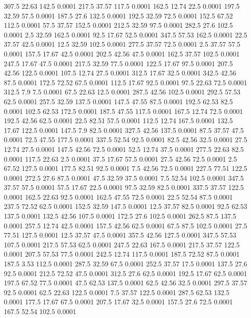 307.5	22.63	142.5	0.0001
217.5	37.57	117.5	0.0001
162.5	12.74	22.5	0.0001
197.5	32.59	57.5	0.0001
187.5	27.6	132.5	0.0001
192.5	32.59	72.5	0.0001
152.5	67.52	112.5	0.0001
57.5	37.57	152.5	0.0001
212.5	32.59	97.5	0.0001
282.5	27.6	102.5	0.0001
2.5	32.59	162.5	0.0001
92.5	17.67	52.5	0.0001
347.5	57.53	162.5	0.0001
22.5	37.57	42.5	0.0001
12.5	32.59	102.5	0.0001
277.5	37.57	72.5	0.0001
2.5	37.57	57.5	0.0001
157.5	17.67	42.5	0.0001
202.5	42.56	47.5	0.0001
162.5	37.57	102.5	0.0001
247.5	17.67	47.5	0.0001
217.5	32.59	77.5	0.0001
122.5	17.67	97.5	0.0001
207.5	42.56	122.5	0.0001
107.5	12.74	27.5	0.0001
312.5	17.67	32.5	0.0001
342.5	42.56	87.5	0.0001
172.5	72.52	67.5	0.0001
112.5	17.67	92.5	0.0001
97.5	22.63	72.5	0.0001
312.5	7.9	7.5	0.0001
67.5	22.63	12.5	0.0001
287.5	42.56	102.5	0.0001
292.5	57.53	62.5	0.0001
257.5	32.59	137.5	0.0001
147.5	47.55	87.5	0.0001
192.5	62.53	82.5	0.0001
102.5	62.53	172.5	0.0001
187.5	47.55	117.5	0.0001
167.5	12.74	72.5	0.0001
192.5	42.56	62.5	0.0001
22.5	82.51	57.5	0.0001
112.5	12.74	167.5	0.0001
132.5	17.67	122.5	0.0001
147.5	7.9	82.5	0.0001
327.5	42.56	137.5	0.0001
87.5	37.57	47.5	0.0001
72.5	47.55	177.5	0.0001
337.5	52.54	92.5	0.0001
82.5	42.56	32.5	0.0001
27.5	12.74	27.5	0.0001
147.5	42.56	72.5	0.0001
52.5	12.74	37.5	0.0001
277.5	22.63	82.5	0.0001
117.5	22.63	2.5	0.0001
37.5	17.67	57.5	0.0001
27.5	42.56	72.5	0.0001
2.5	67.52	127.5	0.0001
177.5	82.51	92.5	0.0001
7.5	42.56	72.5	0.0001
227.5	77.51	122.5	0.0001
272.5	27.6	87.5	0.0001
47.5	32.59	37.5	0.0001
7.5	52.54	102.5	0.0001
347.5	37.57	57.5	0.0001
57.5	17.67	22.5	0.0001
97.5	32.59	82.5	0.0001
337.5	37.57	122.5	0.0001
162.5	22.63	92.5	0.0001
162.5	47.55	72.5	0.0001
22.5	52.54	87.5	0.0001
237.5	72.52	62.5	0.0001
152.5	32.59	147.5	0.0001
12.5	37.57	82.5	0.0001
92.5	62.53	137.5	0.0001
132.5	42.56	107.5	0.0001
172.5	27.6	102.5	0.0001
262.5	87.5	137.5	0.0001
257.5	12.74	42.5	0.0001
157.5	42.56	62.5	0.0001
67.5	87.5	102.5	0.0001
27.5	77.51	127.5	0.0001
12.5	37.57	47.5	0.0001
357.5	42.56	127.5	0.0001
347.5	57.53	107.5	0.0001
217.5	57.53	62.5	0.0001
247.5	22.63	167.5	0.0001
217.5	37.57	122.5	0.0001
207.5	57.53	77.5	0.0001
242.5	12.74	117.5	0.0001
187.5	72.52	87.5	0.0001
187.5	3.53	112.5	0.0001
287.5	32.59	67.5	0.0001
252.5	37.57	17.5	0.0001
137.5	27.6	92.5	0.0001
212.5	72.52	47.5	0.0001
312.5	27.6	62.5	0.0001
192.5	17.67	62.5	0.0001
197.5	67.52	77.5	0.0001
47.5	62.53	137.5	0.0001
62.5	42.56	32.5	0.0001
297.5	37.57	92.5	0.0001
62.5	22.63	122.5	0.0001
7.5	37.57	122.5	0.0001
287.5	62.53	132.5	0.0001
177.5	17.67	67.5	0.0001
207.5	17.67	32.5	0.0001
157.5	27.6	72.5	0.0001
167.5	52.54	102.5	0.0001
